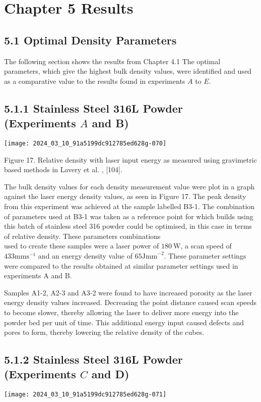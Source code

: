 \documentclass[10pt]{article}
\begin{document}
\section*{Chapter 5 Results}
\subsection*{5.1 Optimal Density Parameters}
The following section shows the results from Chapter 4.1 The optimal parameters, which give the highest bulk density values, were identified and used as a comparative value to the results found in experiments $A$ to $E$.

\subsection*{5.1.1 Stainless Steel 316L Powder (Experiments $A$ and B)}
\begin{center}
\texttt{[image: 2024\_03\_10\_91a5199dc912785ed628g-070]}
\end{center}

Figure 17. Relative density with laser input energy as measured using gravimetric based methods in Lavery et al. , [104].

The bulk density values for each density measurement value were plot in a graph against the laser energy density values, as seen in Figure 17. The peak density from this experiment was achieved at the sample labelled B3-1. The combination of parameters used at B3-1 was taken as a reference point for which builds using this batch of stainless steel 316 powder could be optimised, in this case in terms of relative density. These parameters combinations\\
used to create these samples were a laser power of $180 \mathrm{~W}$, a scan speed of $433 \mathrm{mms}^{-1}$ and an energy density value of $65 \mathrm{Jmm}^{-2}$. These parameter settings were compared to the results obtained at similar parameter settings used in experiments A and B.

Samples A1-2, A2-3 and A3-2 were found to have increased porosity as the laser energy density values increased. Decreasing the point distance caused scan speeds to become slower, thereby allowing the laser to deliver more energy into the powder bed per unit of time. This additional energy input caused defects and pores to form, thereby lowering the relative density of the cubes.

\subsection*{5.1.2 Stainless Steel 316L Powder (Experiments $C$ and D)}
\begin{center}
\texttt{[image: 2024\_03\_10\_91a5199dc912785ed628g-071]}
\end{center}
\end{document}
